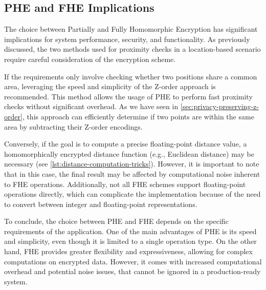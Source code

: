 
\subsection{PHE and FHE Implications}

The choice between Partially and Fully Homomorphic Encryption has significant implications for system performance, security, and functionality. As previously discussed, the two methods used for proximity checks in a location-based scenario require careful consideration of the encryption scheme.

If the requirements only involve checking whether two positions share a common area, leveraging the speed and simplicity of the Z-order approach is recommended. This method allows the usage of PHE to perform fast proximity checks without significant overhead. As we have seen in \cref{sec:privacy-preserving-z-order}, this approach can efficiently determine if two points are within the same area by subtracting their Z-order encodings.

Conversely, if the goal is to compute a precise floating-point distance value, a homomorphically encrypted distance function (e.g., Euclidean distance) may be necessary (see \cref{lst:distance-computation-tricks}). However, it is important to note that in this case, the final result may be affected by computational noise inherent to FHE operations. Additionally, not all FHE schemes support floating-point operations directly, which can complicate the implementation because of the need to convert between integer and floating-point representations.

To conclude, the choice between PHE and FHE depends on the specific requirements of the application. One of the main advantages of PHE is its speed and simplicity, even though it is limited to a single operation type. On the other hand, FHE provides greater flexibility and expressiveness, allowing for complex computations on encrypted data. However, it comes with increased computational overhead and potential noise issues, that cannot be ignored in a production-ready system.

